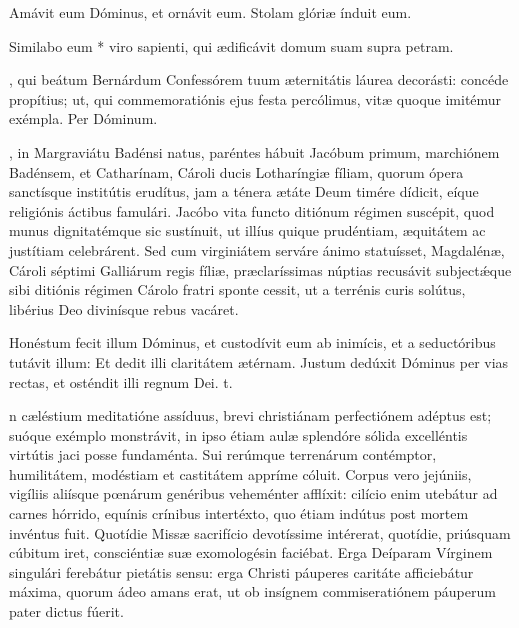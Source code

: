\documentclass[fontsize=9pt,paper=A6,twoside,BCOR=1mm,DIV=22,headinclude]{scrarticle}
\begin{document}
\begin{multicols}{2}

\V Amávit eum Dóminus, et ornávit eum.
\R Stolam glóriæ índuit eum.

 Similabo eum * viro sapienti, qui ædificávit domum suam supra petram.

, qui beátum Bernárdum Confessórem tuum æternitátis láurea decorásti: concéde propítius; ut, qui commemoratiónis ejus festa percólimus, vitæ quoque imitémur exémpla. Per Dóminum.


{
\label{Bernardi-NII}
, in Margraviátu Badénsi natus, paréntes hábuit Jacóbum primum, marchiónem Badénsem, et Catharínam, Cároli ducis Lotharíngiæ fíliam, quorum ópera sanctísque institútis erudítus, jam a ténera ætáte Deum timére dídicit, eíque religiónis áctibus famulári. Jacóbo vita functo ditiónum régimen suscépit, quod munus dignitatémque sic sustínuit, ut illíus quique prudéntiam, æquitátem ac justítiam celebrárent. Sed cum virginiátem serváre ánimo statuísset, Magdalénæ, Cároli séptimi Galliárum regis fíliæ, præclaríssimas núptias recusávit subject\'æque sibi ditiónis régimen Cárolo fratri sponte cessit, ut a terrénis curis solútus, libérius Deo divinísque rebus vacáret.

\R Honéstum fecit illum Dóminus, et custodívit eum ab inimícis, et a seductóribus tutávit illum:
\red{*} Et dedit illi claritátem ætérnam.
\V Justum dedúxit Dóminus per vias rectas, et osténdit illi regnum Dei. t.

n cæléstium meditatióne assíduus, brevi christiánam perfectiónem adéptus est; suóque exémplo monstrávit, in ipso étiam aulæ splendóre sólida excelléntis virtútis jaci posse fundaménta. Sui rerúmque terrenárum contémptor, humilitátem, modéstiam et castitátem appríme cóluit. Corpus vero jejúniis, vigíliis aliísque pœnárum genéribus veheménter afflíxit: cilício enim utebátur ad carnes hórrido, equínis crínibus intertéxto, quo étiam indútus post mortem invéntus fuit. Quotídie Missæ sacrifício devotíssime intérerat, quotídie, priúsquam cúbitum iret, consciéntiæ suæ exomologésin faciébat. Erga Deíparam Vírginem singulári ferebátur pietátis sensu: erga Christi páuperes caritáte afficiebátur máxima, quorum ádeo amans erat, ut ob insígnem commiseratiónem páuperum pater dictus fúerit.

}
\end{multicols}
\end{document}
